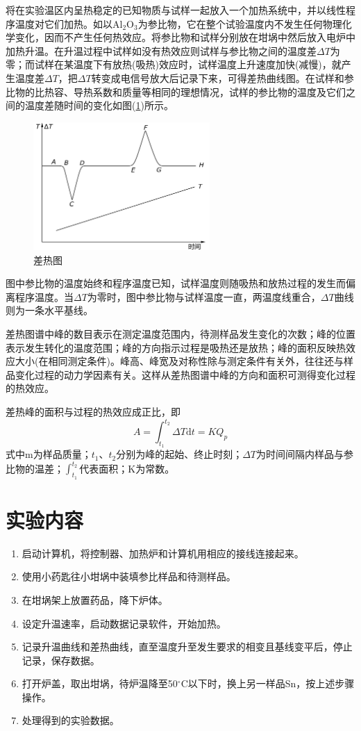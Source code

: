 \documentclass[a4paper]{article}
\begin{document}
将在实验温区内呈热稳定的已知物质与试样一起放入一个加热系统中，并以线性程序温度对它们加热。如以Al$_2$O$_3$为参比物，它在整个试验温度内不发生任何物理化学变化，因而不产生任何热效应。将参比物和试样分别放在坩埚中然后放入电炉中加热升温。在升温过程中试样如没有热效应则试样与参比物之间的温度差$\Delta T$为零；而试样在某温度下有放热(吸热)效应时，试样温度上升速度加快(减慢)，就产生温度差$\Delta T$，把$\Delta T$转变成电信号放大后记录下来，可得差热曲线图。在试样和参比物的比热容、导热系数和质量等相同的理想情况，试样的参比物的温度及它们之间的温度差随时间的变化如图(\ref{fig1})所示。
\begin{figure}[!h]
\centering
\includegraphics[width=0.6\textwidth]{fig/fig1.pdf}
\caption{差热图}\label{fig1}
\end{figure}

图中参比物的温度始终和程序温度已知，试样温度则随吸热和放热过程的发生而偏离程序温度。当$\Delta T$为零时，图中参比物与试样温度一直，两温度线重合，$\Delta T$曲线则为一条水平基线。

差热图谱中峰的数目表示在测定温度范围内，待测样品发生变化的次数；峰的位置表示发生转化的温度范围；峰的方向指示过程是吸热还是放热；峰的面积反映热效应大小(在相同测定条件)。峰高、峰宽及对称性除与测定条件有关外，往往还与样品变化过程的动力学因素有关。这样从差热图谱中峰的方向和面积可测得变化过程的热效应。

差热峰的面积与过程的热效应成正比，即
\begin{equation}
A = \int_{t_1}^{t_2}\Delta T\text{d}t = KQ_p
\end{equation}
式中m为样品质量；$t_1$、$t_2$分别为峰的起始、终止时刻；$\Delta T$为时间间隔内样品与参比物的温差；$\int_{t_1}^{t_2}$代表面积；K为常数。

\section{实验内容}
\begin{enumerate}
\item 启动计算机，将控制器、加热炉和计算机用相应的接线连接起来。
\item 使用小药匙往小坩埚中装填参比样品和待测样品。
\item 在坩埚架上放置药品，降下炉体。
\item 设定升温速率，启动数据记录软件，开始加热。
\item 记录升温曲线和差热曲线，直至温度升至发生要求的相变且基线变平后，停止记录，保存数据。
\item 打开炉盖，取出坩埚，待炉温降至50$^{\circ}$C以下时，换上另一样品Sn，按上述步骤操作。
\item 处理得到的实验数据。
\end{enumerate}
\end{document}
